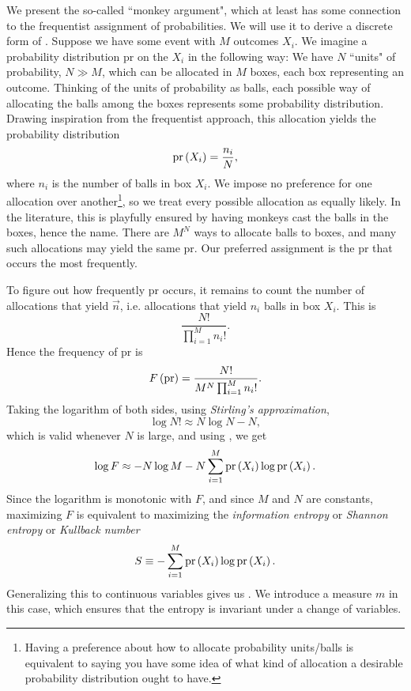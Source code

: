 We present the so-called ``monkey argument", which at least has some connection
to the frequentist assignment of probabilities. We will use it to derive a
discrete form of . Suppose we have some event with $M$
outcomes $X_i$. We imagine a probability distribution pr on the $X_i$ in the
following way: We have $N$ ``units" of probability, $N\gg M$, which can be
allocated in $M$ boxes, each box representing an outcome. Thinking of the
units of probability as balls, each possible way of allocating the balls among
the boxes represents some probability distribution. Drawing inspiration from the
frequentist approach, this allocation yields the probability distribution
\begin{equation}\label{eq:entropyProbability}
\operatorname{pr}\left(X_i\right)=\frac{n_i}{N},
\end{equation}
where $n_i$ is the number of balls in box $X_i$. We impose no
preference for one allocation over another\footnote{Having a preference about
how to allocate probability units/balls is equivalent to saying you have some
idea of what kind of allocation a desirable probability distribution ought to
have.}, so we treat every
possible allocation as equally likely. In the literature, this is playfully
ensured by having monkeys cast the balls in the boxes, hence the name.
There are $M^N$ ways to allocate balls to boxes, and many such allocations
may yield the same pr. Our preferred assignment is the pr that occurs the most 
frequently.

To figure out how frequently pr occurs, it remains to count the number of
allocations that yield $\vec{n}$, i.e. allocations
that yield $n_i$ balls in box $X_i$. This is
\begin{equation}
\frac{N!}{\prod_{i=1}^Mn_i!}.
\end{equation}
Hence the frequency of pr is
\begin{equation}
F\left({\rm pr}\right)=\frac{N!}{M^N\prod_{i=1}^Mn_i!}.
\end{equation}
Taking the logarithm of both sides, using {\it Stirling's
approximation},
\begin{equation}
\log N!\approx N\log N-N,
\end{equation}
which is valid whenever $N$ is large, and using
, we get
\begin{equation}
\log F \approx  -N\log M -N\sum_{i=1}^M \operatorname{pr}\left(X_i\right)\log\operatorname{pr}\left(X_i\right).
\end{equation}
Since the logarithm is monotonic with $F$, and since $M$ and $N$ are constants,
maximizing $F$ is equivalent to maximizing the {\it information
entropy} or {\it Shannon
entropy} or {\it Kullback number}
\begin{equation}
S\equiv  -\sum_{i=1}^M \operatorname{pr}\left(X_i\right)\log\operatorname{pr}\left(X_i\right).
\end{equation}
Generalizing this to continuous variables gives us
. We introduce a measure $m$ in this case, which
ensures that the entropy is invariant under a change of variables.


